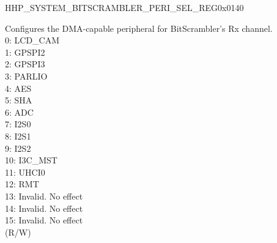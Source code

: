 \begin{register}{H}{HP\_SYSTEM\_BITSCRAMBLER\_PERI\_SEL\_REG}{0x0140}\label{regdesc:HPSYSTEMBITSCRAMBLERPERISELREG}
%
%
%
\regnewline%
\begin{regdesc}\begin{reglist}
\label{fielddesc:HPSYSTEMBITSCRAMBLERPERIRXSEL}\item [HP\_SYSTEM\_BITSCRAMBLER\_PERI\_RX\_SEL] Configures the DMA-capable peripheral for BitScrambler's Rx channel.\\
0: LCD\_CAM \\
1: GPSPI2 \\
2: GPSPI3 \\
3: PARLIO \\
4: AES \\
5: SHA \\
6: ADC \\
7: I2S0 \\
8: I2S1 \\
9: I2S2 \\
10: I3C\_MST \\
11: UHCI0 \\
12: RMT \\
13: Invalid. No effect\\
14: Invalid. No effect\\
15: Invalid. No effect\\
(R/W)
\item [Continued on the next page...]
\end{reglist}\end{regdesc}
\end{register}
\addtocounter{Regfloat}{-1}


